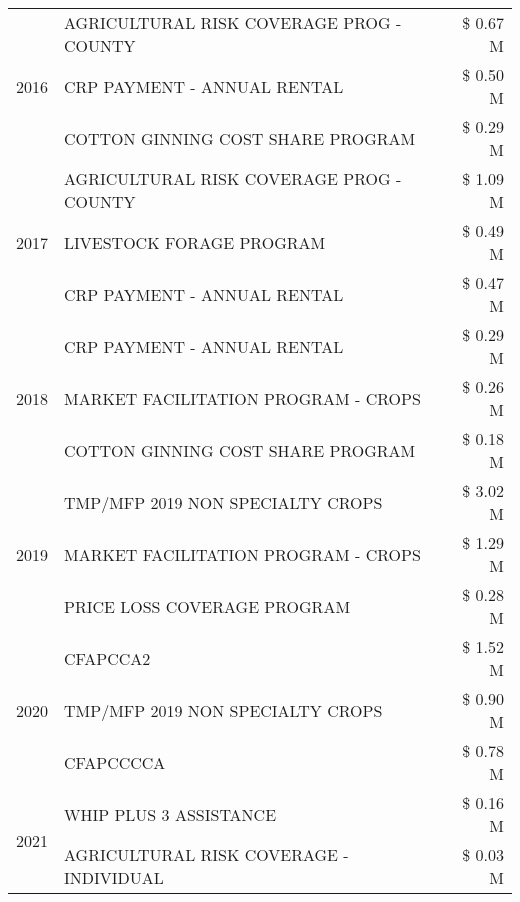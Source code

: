 \begin{tabular}{llr}
\cline{1-3}
\multirow[t]{3}{*}{2016} & AGRICULTURAL RISK COVERAGE PROG - COUNTY & \$ 0.67 M \\
 & CRP PAYMENT - ANNUAL RENTAL & \$ 0.50 M \\
 & COTTON GINNING COST SHARE PROGRAM & \$ 0.29 M \\
\cline{1-3}
\multirow[t]{3}{*}{2017} & AGRICULTURAL RISK COVERAGE PROG - COUNTY & \$ 1.09 M \\
 & LIVESTOCK FORAGE PROGRAM & \$ 0.49 M \\
 & CRP PAYMENT - ANNUAL RENTAL & \$ 0.47 M \\
\cline{1-3}
\multirow[t]{3}{*}{2018} & CRP PAYMENT - ANNUAL RENTAL & \$ 0.29 M \\
 & MARKET FACILITATION PROGRAM - CROPS & \$ 0.26 M \\
 & COTTON GINNING COST SHARE PROGRAM & \$ 0.18 M \\
\cline{1-3}
\multirow[t]{3}{*}{2019} & TMP/MFP 2019 NON SPECIALTY CROPS & \$ 3.02 M \\
 & MARKET FACILITATION PROGRAM - CROPS & \$ 1.29 M \\
 & PRICE LOSS COVERAGE PROGRAM & \$ 0.28 M \\
\cline{1-3}
\multirow[t]{3}{*}{2020} & CFAPCCA2 & \$ 1.52 M \\
 & TMP/MFP 2019 NON SPECIALTY CROPS & \$ 0.90 M \\
 & CFAPCCCCA & \$ 0.78 M \\
\cline{1-3}
\multirow[t]{2}{*}{2021} & WHIP PLUS 3 ASSISTANCE & \$ 0.16 M \\
 & AGRICULTURAL RISK COVERAGE - INDIVIDUAL & \$ 0.03 M \\
\cline{1-3}
\bottomrule
\end{tabular}
